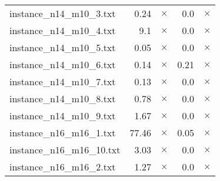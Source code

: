 \documentclass{article}
\begin{document}
\begin{center}
\begin{tabular}{lrrrr}
instance\_n14\_m10\_3.txt & 0.24 & 
$\times$
 & 0.0 & 
$\times$
\\
instance\_n14\_m10\_4.txt & 9.1 & 
$\times$
 & 0.0 & 
$\times$
\\
instance\_n14\_m10\_5.txt & 0.05 & 
$\times$
 & 0.0 & 
$\times$
\\
instance\_n14\_m10\_6.txt & 0.14 & 
$\times$
 & 0.21 & 
$\times$
\\
instance\_n14\_m10\_7.txt & 0.13 & 
$\times$
 & 0.0 & 
$\times$
\\
instance\_n14\_m10\_8.txt & 0.78 & 
$\times$
 & 0.0 & 
$\times$
\\
instance\_n14\_m10\_9.txt & 1.67 & 
$\times$
 & 0.0 & 
$\times$
\\
instance\_n16\_m16\_1.txt & 77.46 & 
$\times$
 & 0.05 & 
$\times$
\\
instance\_n16\_m16\_10.txt & 3.03 & 
$\times$
 & 0.0 & 
$\times$
\\
instance\_n16\_m16\_2.txt & 1.27 & 
$\times$
 & 0.0 & 
$\times$
\\
\hline\end{tabular}
\end{center}
\end{document}
